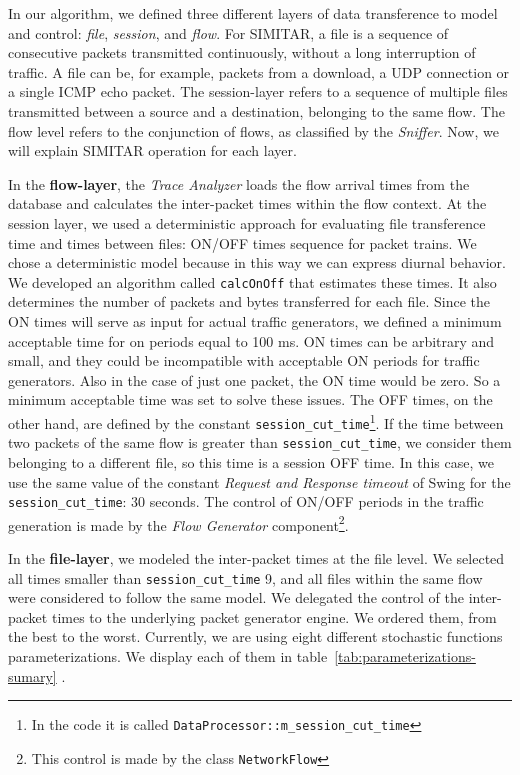 In our algorithm, we defined three different layers of data transference to model and control: \textit{file}, \textit{session}, and \textit{flow}. For SIMITAR, a file is a sequence of consecutive packets transmitted continuously, without a long interruption of traffic. A file can be, for example, packets from a download, a UDP connection or a single ICMP echo packet. The session-layer refers to a sequence of multiple files transmitted between a source and a destination, belonging to the same flow. The flow level refers to the conjunction of flows, as classified by the \textit{Sniffer}. Now, we will explain SIMITAR operation for each layer.

In the \textbf{flow-layer}, the \textit{Trace Analyzer}  loads the flow arrival times from the database and calculates the inter-packet times within the flow context. At the session layer, we used a deterministic approach for evaluating file transference time and times between files: ON/OFF times sequence for packet trains. We chose a deterministic model because in this way we can express diurnal behavior. We developed an algorithm called \texttt{calcOnOff} that estimates these times. It also determines the number of packets and bytes transferred for each file. Since the ON times will serve as input for actual traffic generators, we defined a minimum acceptable time for on periods equal to 100 ms. ON times can be arbitrary and small, and they could be incompatible with acceptable ON periods for traffic generators. Also in the case of just one packet, the ON time would be zero. So  a minimum acceptable time was set to solve these issues. The OFF times, on the other hand, are defined by the constant \texttt{session\_cut\_time}\footnote{In the code it is called \texttt{DataProcessor::m\_session\_cut\_time} }. If the time between two packets of the same flow is greater than \texttt{session\_cut\_time}, we consider them belonging to a different file, so this time is a session OFF time. In this case, we use the same value of the constant \textit{Request and Response timeout} of Swing\cite{swing-paper} for the \texttt{session\_cut\_time}: 30 seconds. The control of ON/OFF periods in the traffic generation is made by the \textit{Flow Generator} component\footnote{This control is made by the class \texttt{NetworkFlow}}.

In the \textbf{file-layer}, we modeled the inter-packet times at the file level. We selected all times smaller than \texttt{session\_cut\_time} 9, and all files within the same flow were considered to follow the same model. We delegated the control of the inter-packet times to the underlying packet generator engine. We ordered them, from the best to the worst. Currently, we are using eight different stochastic functions parameterizations. We display each of them in table~\ref{tab:parameterizations-sumary} .

